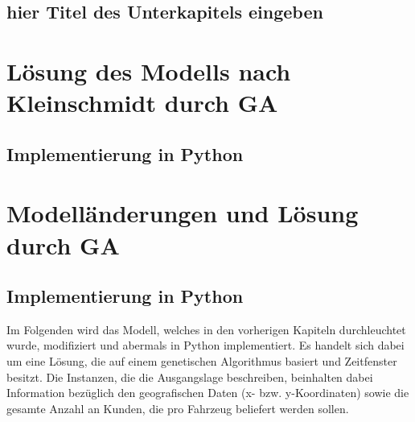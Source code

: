 \documentclass[a4paper,12pt,parskip,bibtotoc,liststotoc]{article}
\begin{document}
\subsection{hier Titel des Unterkapitels eingeben}
%
%

%
%
\newpage



\section{Lösung des Modells nach Kleinschmidt durch GA}


\subsection{Implementierung in Python}


\newpage


\section{Modelländerungen und Lösung durch GA}

\subsection{Implementierung in Python}


Im Folgenden wird das Modell, welches in den vorherigen Kapiteln durchleuchtet wurde, modifiziert und abermals in Python implementiert.
Es handelt sich dabei um eine Lösung, die auf einem genetischen Algorithmus basiert und Zeitfenster besitzt. 
Die Instanzen, die die Ausgangslage beschreiben, beinhalten dabei Information bezüglich den geografischen Daten (x- bzw. y-Koordinaten) sowie die gesamte Anzahl an Kunden, die pro Fahrzeug beliefert werden sollen.
\end{document}
